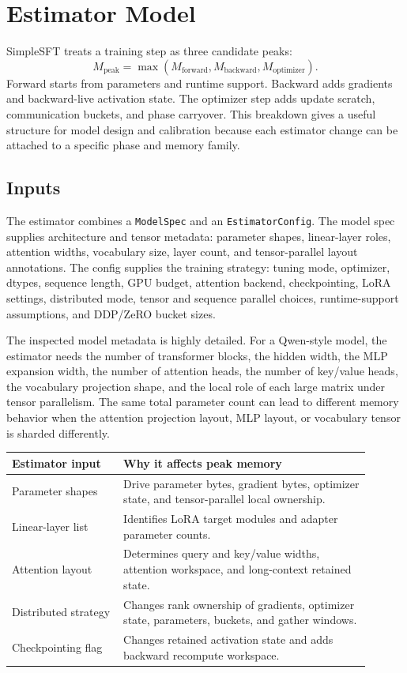 \section{Estimator Model}
SimpleSFT treats a training step as three candidate peaks:
\[
M_{\mathrm{peak}} =
\max(M_{\mathrm{forward}}, M_{\mathrm{backward}}, M_{\mathrm{optimizer}}).
\]
Forward starts from parameters and runtime support. Backward adds gradients and
backward-live activation state. The optimizer step adds update scratch,
communication buckets, and phase carryover. This breakdown gives a useful
structure for model design and calibration because each estimator change can be
attached to a specific phase and memory family.

\subsection{Inputs}
The estimator combines a \texttt{ModelSpec} and an \texttt{EstimatorConfig}.
The model spec supplies architecture and tensor metadata: parameter shapes,
linear-layer roles, attention widths, vocabulary size, layer count, and
tensor-parallel layout annotations. The config supplies the training strategy:
tuning mode, optimizer, dtypes, sequence length, GPU budget, attention backend,
checkpointing, LoRA settings, distributed mode, tensor and sequence parallel
choices, runtime-support assumptions, and DDP/ZeRO bucket sizes.

The inspected model metadata is highly detailed. For a
Qwen-style model, the estimator needs the number of transformer blocks, the
hidden width, the MLP expansion width, the number of attention heads, the number
of key/value heads, the vocabulary projection shape, and the local role of each
large matrix under tensor parallelism. The same total parameter count can lead
to different memory behavior when the attention projection layout, MLP layout,
or vocabulary tensor is sharded differently.

\begin{center}
\small
\begin{tabular}{@{}p{0.28\linewidth}p{0.62\linewidth}@{}}
\toprule
Estimator input & Why it affects peak memory \\
\midrule
Parameter shapes & Drive parameter bytes, gradient bytes, optimizer state, and
tensor-parallel local ownership. \\
Linear-layer list & Identifies LoRA target modules and adapter parameter
counts. \\
Attention layout & Determines query and key/value widths, attention workspace,
and long-context retained state. \\
Distributed strategy & Changes rank ownership of gradients, optimizer state,
parameters, buckets, and gather windows. \\
Checkpointing flag & Changes retained activation state and adds backward
recompute workspace. \\
\bottomrule
\end{tabular}
\normalsize
\end{center}

